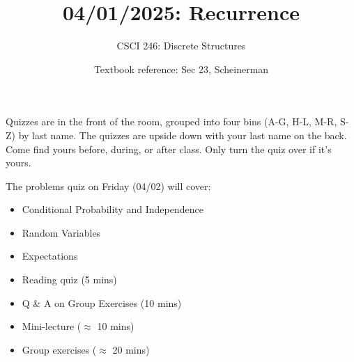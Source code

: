 \documentclass[10pt]{beamer}
\begin{document}




\title{04/01/2025: Recurrence}
\author{CSCI 246: Discrete Structures}
\date{Textbook reference: Sec 23, Scheinerman}

\begin{frame}
    \titlepage 
\end{frame}


\begin{frame}
\small
\begin{mygreenbox}[title=Graded Quiz Pickup]
Quizzes are in the front of the room, grouped into four bins (A-G, H-L, M-R, S-Z) by last name. The quizzes are upside down with your last name on the back. Come find yours before, during, or after class. Only turn the quiz over if it's yours.
\end{mygreenbox} 
\vfill 
\begin{myredbox}[title=Friday's Problems Quiz]
The problems quiz on Friday (04/02) will cover:
\begin{itemize}
\item Conditional Probability and Independence
\item Random Variables
\item Expectations	
\end{itemize}

\end{myredbox}
\vfill 
\begin{myyellowbox}[title=Today's Agenda]
\begin{itemize}
	\item Reading quiz (5 mins)
	\item Q \& A on Group Exercises (10 mins)
	\item Mini-lecture ($\approx$ 10 mins)
	\item Group exercises ($\approx$ 20 mins)
\end{itemize}


\end{myyellowbox}
\vfill 

\end{frame}
\end{document}
